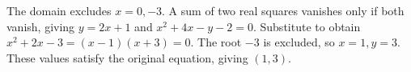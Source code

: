 The domain excludes $x=0,-3$. A sum of two real squares vanishes only if both vanish, giving $y=2x+1$ and $x^2+4x-y-2=0$. Substitute to obtain $x^2+2x-3=(x-1)(x+3)=0$. The root $-3$ is excluded, so $x=1,y=3$. These values satisfy the original equation, giving $\boxed{(1,3)}$.
